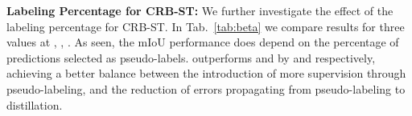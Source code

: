 \documentclass[10pt,twocolumn,letterpaper]{article}
\begin{document}
\noindent \textbf{Labeling Percentage for CRB-ST:} We further investigate the effect of the labeling percentage  for CRB-ST. In Tab.~\ref{tab:beta} we compare results for three  values at , , . As seen, the mIoU performance does depend on the percentage of predictions selected as pseudo-labels.  outperforms  and  by  and  respectively, achieving a better balance between the introduction of more supervision through pseudo-labeling, and the reduction of errors propagating from pseudo-labeling to distillation.

\begin{table}[t]
        \centering
        \tabcolsep=0.11cm
        \caption{Investigating the effect of  for CRB-ST.}
        \label{tab:beta}
\end{table}
\end{document}
